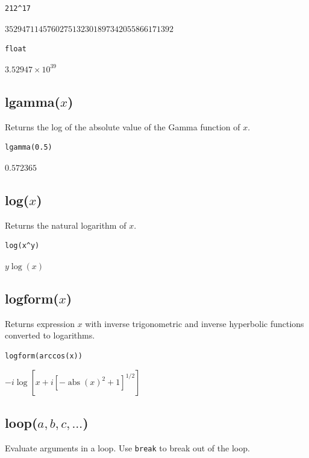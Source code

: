 \documentclass[12pt]{article}
\begin{document}
{\color{blue}
\begin{verbatim}
212^17
\end{verbatim}
}

$3529471145760275132301897342055866171392$

{\color{blue}
\begin{verbatim}
float
\end{verbatim}
}

$\displaystyle 3.52947\times10^{39}$

\subsection*{lgamma($x$)}

Returns the log of the absolute value of the Gamma function of $x$.

{\color{blue}
\begin{verbatim}
lgamma(0.5)
\end{verbatim}
}

$0.572365$

\subsection*{log($x$)}

Returns the natural logarithm of $x$.

{\color{blue}
\begin{verbatim}
log(x^y)
\end{verbatim}
}

$y\log(x)$

\subsection*{logform($x$)}

Returns expression $x$ with inverse trigonometric and
inverse hyperbolic functions converted to logarithms.

{\color{blue}
\begin{verbatim}
logform(arccos(x))
\end{verbatim}
}

$\displaystyle
-i\log\left[x+i\left[-\operatorname{abs}(x)^2+1\right]^{1/2}\right]
$

\subsection*{loop($a,b,c,\ldots$)}

Evaluate arguments in a loop. Use \verb$break$ to break out of the loop.
\end{document}
